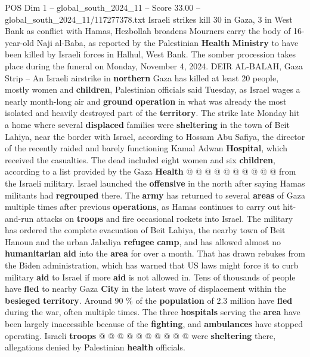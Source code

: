 \begin{textsample}{POS Dim 1 – global\_south\_2024\_11 – Score 33.00 – global\_south\_2024\_11/117277378.txt}  \label{ex:f1_pos_242}
Israeli strikes kill 30 in Gaza, 3 in West Bank as conflict with Hamas, Hezbollah broadens Mourners carry the body of 16-year-old Naji al-Baba, as reported by the Palestinian \textbf{Health} \textbf{Ministry} to have been killed by Israeli forces in Halhul, West Bank.
The somber procession takes place during the funeral on Monday, November 4, 2024.
DEIR AL-BALAH, Gaza Strip -- An Israeli airstrike in \textbf{northern} Gaza has killed at least 20 people, mostly women and \textbf{children}, Palestinian officials said Tuesday, as Israel wages a nearly month-long air and \textbf{ground} \textbf{operation} in what was already the most isolated and heavily destroyed part of the \textbf{territory}.
The strike late Monday hit a home where several \textbf{displaced} families were \textbf{sheltering} in the town of Beit Lahiya, near the border with Israel, according to Hossam Abu Safiya, the director of the recently raided and barely functioning Kamal Adwan \textbf{Hospital}, which received the casualties.
The dead included eight women and six \textbf{children}, according to a list provided by the Gaza \textbf{Health} @ @ @ @ @ @ @ @ @ @ from the Israeli military.
Israel launched the \textbf{offensive} in the north after saying Hamas militants had \textbf{regrouped} there.
The \textbf{army} has returned to several \textbf{areas} of Gaza multiple times after previous \textbf{operations}, as Hamas continues to carry out hit-and-run attacks on \textbf{troops} and fire occasional rockets into Israel.
The military has ordered the complete evacuation of Beit Lahiya, the nearby town of Beit Hanoun and the urban Jabaliya \textbf{refugee} \textbf{camp}, and has allowed almost no \textbf{humanitarian} \textbf{aid} into the \textbf{area} for over a month.
That has drawn rebukes from the Biden administration, which has warned that US laws might force it to curb military \textbf{aid} to Israel if more \textbf{aid} is not allowed in.
Tens of thousands of people have \textbf{fled} to nearby Gaza \textbf{City} in the latest wave of displacement within the \textbf{besieged} \textbf{territory}.
Around 90 \% of the \textbf{population} of 2.3 million have \textbf{fled} during the war, often multiple times.
The three \textbf{hospitals} serving the \textbf{area} have been largely inaccessible because of the \textbf{fighting}, and \textbf{ambulances} have stopped operating.
Israeli \textbf{troops} @ @ @ @ @ @ @ @ @ @ were \textbf{sheltering} there, allegations denied by Palestinian \textbf{health} officials.

\end{textsample}
